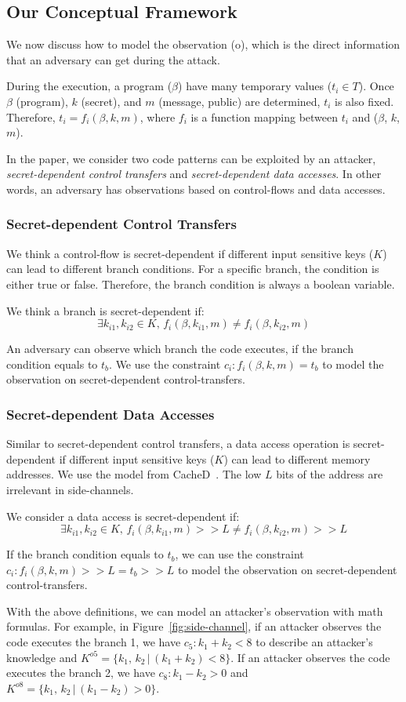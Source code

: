 \subsection{Our Conceptual Framework}
\label{side-channel:condition}
We now discuss how to model the observation (o), which is the direct information
that an adversary can get during the attack.

During the execution, a program ($\beta$) have many temporary values ($t_i \in
T$). Once $\beta$ (program), $k$ (secret), and $m$ (message, public) are
determined, $t_i$ is also fixed. Therefore, $ t_i = f_i(\beta, k, m)$, where $f_
i$ is a function mapping between $t_i$ and ($\beta$, $k$, $m$).

In the paper, we consider two code patterns can be exploited by an attacker,
\emph{secret-dependent control transfers} and \emph{secret-dependent data
accesses}. In other words, an adversary has observations based on control-flows
and data accesses.

\subsubsection{Secret-dependent Control Transfers}
We think a control-flow is secret-dependent if different input sensitive keys
($K$) can lead to different branch conditions. For a specific branch, the
condition is either true or false. Therefore, the branch condition is always a
boolean variable.

We think a branch is secret-dependent if:
$$\exists k_{i1}, k_{i2} \in K, \,f_i(\beta, k_{i1}, m) \neq f_i(\beta, k_{i2}, m)$$

An adversary can observe which branch the code executes, if the branch condition
equals to $t_b$. We use the constraint $c_i : f_i(\beta, k, m) = t_b$ to model
the observation on secret-dependent control-transfers.

\subsubsection{Secret-dependent Data Accesses}
Similar to secret-dependent control transfers, a data access operation is
secret-dependent if different input sensitive keys ($K$) can lead to different
memory addresses. We use the model from CacheD~\cite{203878}. The low $L$ bits
of the address are irrelevant in side-channels.

We consider a data access is secret-dependent if:
$$\exists k_{i1}, k_{i2} \in K, \,f_i(\beta, k_{i1}, m) >> L \neq f_i(\beta, k_{i2}, m) >> L$$

If the branch condition equals to $t_b$, we can use the constraint $c_i :
f_i(\beta, k, m) >> L = t_b >> L$ to model the observation on secret-dependent
control-transfers.

With the above definitions, we can model an attacker's observation with math
formulas. For example, in Figure~\ref{fig:side-channel}, if an attacker observes
the code executes the branch 1, we have $c_5: k_1 + k_2 < 8$ to describe an
attacker's knowledge and $K^{o5} = \{k_1,\, k_2\,|\, (k_1 + k_2) < 8\}$. If an
attacker observes the code executes the branch 2, we have $c_8: k_1 - k_2 > 0$
and $K^{o8} = \{k_1,\, k_2\,|\, (k_1 - k_2) > 0\}$.
